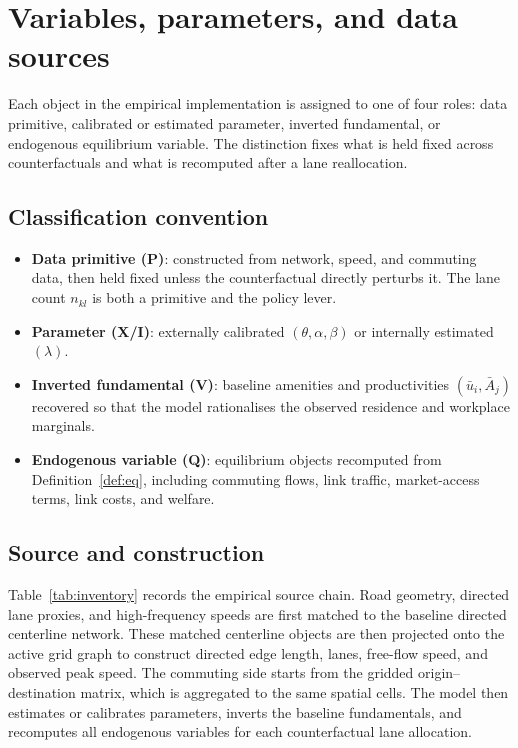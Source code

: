 \documentclass[12pt]{article}
\newcommand{\ubar}{\bar u}
\newcommand{\Abar}{\bar A}
\begin{document}
\section{Variables, parameters, and data sources}\label{sec:inventory}

Each object in the empirical implementation is assigned to one of
four roles: data primitive, calibrated or estimated parameter,
inverted fundamental, or endogenous equilibrium variable.  The
distinction fixes what is held fixed across counterfactuals and what
is recomputed after a lane reallocation.

\subsection{Classification convention}\label{ssec:classification}

\begin{itemize}[leftmargin=2em,itemsep=0.2em]
\item \textbf{Data primitive (P)}: constructed from network, speed,
  and commuting data, then held fixed unless the counterfactual
  directly perturbs it.  The lane count $n_{kl}$ is both a primitive
  and the policy lever.
\item \textbf{Parameter (X/I)}: externally calibrated
  $(\theta,\alpha,\beta)$ or internally estimated $(\lambda)$.
\item \textbf{Inverted fundamental (V)}: baseline amenities and
  productivities $(\ubar_i,\Abar_j)$ recovered so that the model
  rationalises the observed residence and workplace marginals.
\item \textbf{Endogenous variable (Q)}: equilibrium objects
  recomputed from Definition~\ref{def:eq}, including commuting
  flows, link traffic, market-access terms, link costs, and welfare.
\end{itemize}

\subsection{Source and construction}\label{ssec:inventory}

Table~\ref{tab:inventory} records the empirical source chain.  Road
geometry, directed lane proxies, and high-frequency speeds are first
matched to the baseline directed centerline network.  These matched
centerline objects are then projected onto the active grid graph to
construct directed edge length, lanes, free-flow speed, and observed
peak speed.  The commuting side starts from the gridded origin--
destination matrix, which is aggregated to the same spatial cells.
The model then estimates or calibrates parameters, inverts the
baseline fundamentals, and recomputes all endogenous variables for
each counterfactual lane allocation.
\end{document}
